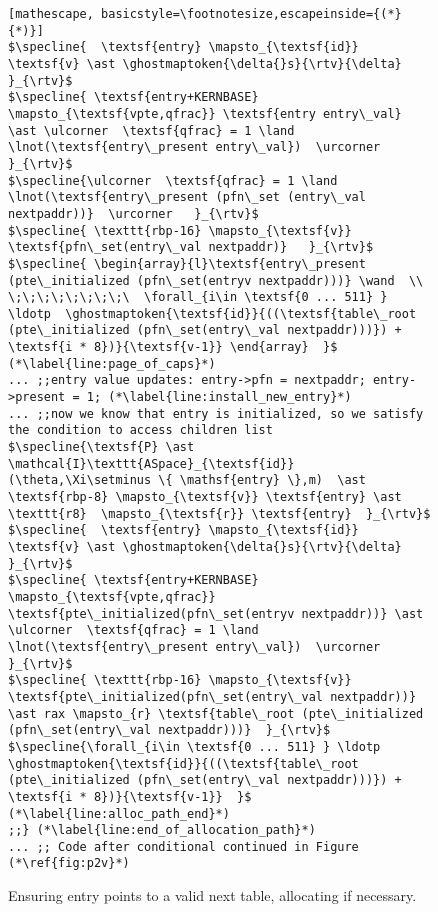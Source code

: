 \begin{figure}
\begin{lstlisting}[mathescape, basicstyle=\footnotesize,escapeinside={(*}{*)}]
$\specline{  \textsf{entry} \mapsto_{\textsf{id}} \textsf{v} \ast \ghostmaptoken{\delta{}s}{\rtv}{\delta} }_{\rtv}$
$\specline{ \textsf{entry+KERNBASE} \mapsto_{\textsf{vpte,qfrac}} \textsf{entry entry\_val} \ast \ulcorner  \textsf{qfrac} = 1 \land \lnot(\textsf{entry\_present entry\_val})  \urcorner }_{\rtv}$
$\specline{\ulcorner  \textsf{qfrac} = 1 \land \lnot(\textsf{entry\_present (pfn\_set (entry\_val nextpaddr))}  \urcorner   }_{\rtv}$
$\specline{ \texttt{rbp-16} \mapsto_{\textsf{v}} \textsf{pfn\_set(entry\_val nextpaddr)}   }_{\rtv}$
$\specline{ \begin{array}{l}\textsf{entry\_present (pte\_initialized (pfn\_set(entryv nextpaddr)))} \wand  \\ \;\;\;\;\;\;\;\;\  \forall_{i\in \textsf{0 ... 511} } \ldotp  \ghostmaptoken{\textsf{id}}{((\textsf{table\_root (pte\_initialized (pfn\_set(entry\_val nextpaddr)))}) + \textsf{i * 8})}{\textsf{v-1}} \end{array}  }$ (*\label{line:page_of_caps}*)
... ;;entry value updates: entry->pfn = nextpaddr; entry->present = 1; (*\label{line:install_new_entry}*)
... ;;now we know that entry is initialized, so we satisfy the condition to access children list
$\specline{\textsf{P} \ast \mathcal{I}\texttt{ASpace}_{\textsf{id}}(\theta,\Xi\setminus \{ \mathsf{entry} \},m)  \ast \textsf{rbp-8} \mapsto_{\textsf{v}} \textsf{entry} \ast \texttt{r8}  \mapsto_{\textsf{r}} \textsf{entry}  }_{\rtv}$
$\specline{  \textsf{entry} \mapsto_{\textsf{id}} \textsf{v} \ast \ghostmaptoken{\delta{}s}{\rtv}{\delta} }_{\rtv}$
$\specline{ \textsf{entry+KERNBASE} \mapsto_{\textsf{vpte,qfrac}}  \textsf{pte\_initialized(pfn\_set(entryv nextpaddr))} \ast \ulcorner  \textsf{qfrac} = 1 \land \lnot(\textsf{entry\_present entry\_val})  \urcorner }_{\rtv}$
$\specline{ \texttt{rbp-16} \mapsto_{\textsf{v}} \textsf{pte\_initialized(pfn\_set(entry\_val nextpaddr))}  \ast rax \mapsto_{r} \textsf{table\_root (pte\_initialized (pfn\_set(entry\_val nextpaddr)))}  }_{\rtv}$
$\specline{\forall_{i\in \textsf{0 ... 511} } \ldotp  \ghostmaptoken{\textsf{id}}{((\textsf{table\_root (pte\_initialized (pfn\_set(entry\_val nextpaddr)))}) + \textsf{i * 8})}{\textsf{v-1}}  }$ (*\label{line:alloc_path_end}*)
;;} (*\label{line:end_of_allocation_path}*)
... ;; Code after conditional continued in Figure (*\ref{fig:p2v}*)
\end{lstlisting}
\vspace{-1em}
\caption{Ensuring \textsf{entry} points to a valid next table, allocating if necessary.}
\label{fig:calltopteinitialize}
\end{figure}

